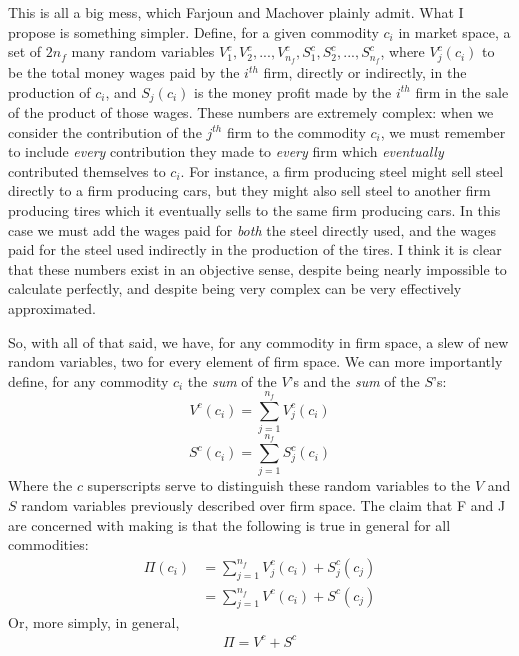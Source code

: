 \documentclass{article}
\theoremstyle{definition}
\theoremstyle{plain}
\theoremstyle{theorem}
\begin{document}
This is all a big mess, which Farjoun and Machover plainly admit. What I propose is something simpler. Define, for a given commodity $c_i$ in market space, a set of $2n_f$ many random variables $V_1^c, V_2^c,...,V_{n_f}^c,S_1^c,S_2^c,...,S_{n_f}^c$, where $V_j^c(c_i)$ to be the total money wages paid by the $i^{th}$ firm, directly or indirectly, in the production of $c_i$, and $S_j(c_i)$ is the money profit made by the $i^{th}$ firm in the sale of the product of those wages. These numbers are extremely complex: when we consider the contribution of the $j^{th}$ firm to the commodity $c_i$, we must remember to include \textit{every} contribution they made to \textit{every} firm which \textit{eventually} contributed themselves to $c_i$. For instance, a firm producing steel might sell steel directly to a firm producing cars, but they might also sell steel to another firm producing tires which it eventually sells to the same firm producing cars. In this case we must add the wages paid for \textit{both} the steel directly used, and the wages paid for the steel used indirectly in the production of the tires. I think it is clear that these numbers exist in an objective sense, despite being nearly impossible to calculate perfectly, and despite being very complex can be very effectively approximated. \par 
So, with all of that said, we have, for any commodity in firm space, a slew of new random variables, two for every element of firm space. We can more importantly define, for any commodity $c_i$ the \textit{sum} of the $V$'s and the \textit{sum} of the $S$'s:
\[ V^c(c_i) = \sum_{j=1}^{n_f} V_j^c(c_i) \]
\[ S^c(c_i) = \sum_{j=1}^{n_f} S_j^c(c_i) \]
Where the $c$ superscripts serve to distinguish these random variables to the $V$ and $S$ random variables previously described over firm space. The claim that F and J are concerned with making is that the following is true in general for all commodities:
\begin{align}
	\Pi(c_i) &= \sum_{j=1}^{n_f} V^c_j(c_i) + S^c_j(c_j) \\
			&= \sum_{j=1}^{n_f} V^c(c_i)+S^c(c_j)
\end{align}
Or, more simply, in general, 
\begin{align}
	\Pi = V^c + S^c
\end{align}
\end{document}
